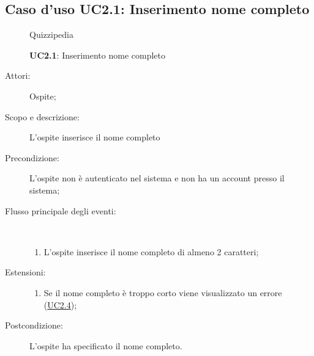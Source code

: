 \subsection{Caso d'uso UC2.1: Inserimento nome completo}
	\begin{figure}[H]
		\centering
		\begin{resizedtikzpicture}{\textwidth}
		\begin{umlsystem}[x=0, fill=lightgray!20]{Quizzipedia}
		\end{umlsystem}
		\end{resizedtikzpicture}
		\caption{\textbf{UC2.1}: Inserimento nome completo}
		\label{UC2.1}
	\end{figure}
\begin{description}
\item[Attori:] Ospite;
\item[Scopo e descrizione:] L'ospite inserisce il nome completo
      \item[Precondizione:] L'ospite non è autenticato nel sistema e non ha un account presso il sistema;

        \item[Flusso principale degli eventi:] \ 
 \begin{enumerate}
          \item L'ospite inserisce il nome completo di almeno 2 caratteri;

      \end{enumerate}
    \item[Estensioni:]
      \begin{enumerate}
          \item Se il nome completo è troppo corto viene visualizzato un errore (\hyperlink{UC2.4}{UC2.4});

      \end{enumerate}
    \item[Postcondizione:] L'ospite ha specificato il nome completo.
  \end{description}
\hypertarget{UC2.2}{}
